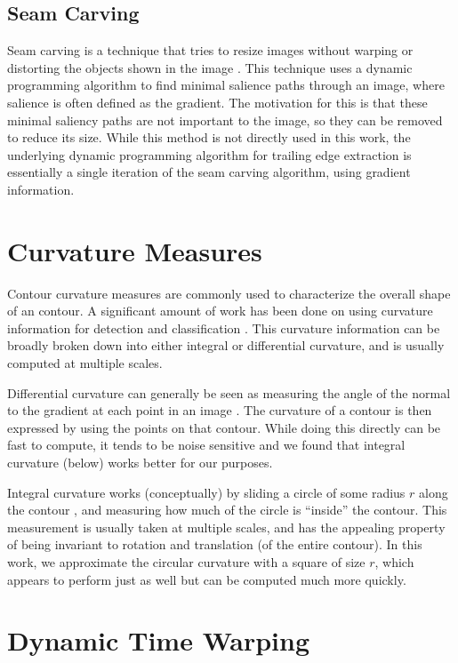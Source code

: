 \subsection{Seam Carving}

Seam carving is a technique that tries to resize images without warping or distorting the objects shown in the image \cite{Avidan:2007:SCC:1276377.1276390}.
This technique uses a dynamic programming algorithm to find minimal salience paths through an image, where salience is often defined as the gradient.
The motivation for this is that these minimal saliency paths are not important to the image, so they can be removed to reduce its size.
While this method is not directly used in this work, the underlying dynamic programming algorithm for trailing edge extraction is essentially a single iteration of the seam carving algorithm, using gradient information.

\section{Curvature Measures}

Contour curvature measures are commonly used to characterize the overall shape of an contour. 
A significant amount of work has been done on using curvature information for detection \cite{monroy2011beyond} and classification \cite{fischer2014image, kumar2012leafsnap}. 
This curvature information can be broadly broken down into either integral or differential curvature, and is usually computed at multiple scales.

Differential curvature can generally be seen as measuring the angle of the normal to the gradient at each point in an image \cite{fischer2014image}.
The curvature of a contour is then expressed by using the points on that contour.
While doing this directly can be fast to compute, it tends to be noise sensitive and we found that integral curvature (below) works better for our purposes.

Integral curvature works (conceptually) by sliding a circle of some radius $r$ along the contour \cite{pottmann2007integral}, and measuring how much of the circle is ``inside'' the contour.
This measurement is usually taken at multiple scales, and has the appealing property of being invariant to rotation and translation (of the entire contour).
In this work, we approximate the circular curvature with a square of size $r$, which appears to perform just as well but can be computed much more quickly.

\section{Dynamic Time Warping}

